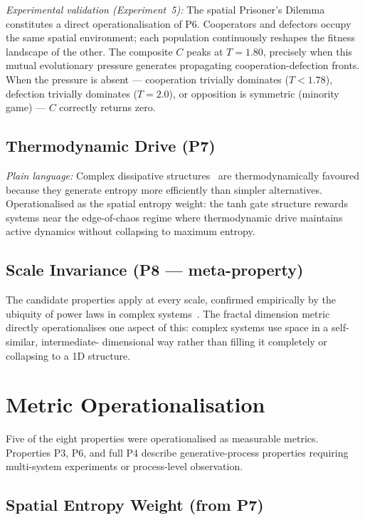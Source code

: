 \documentclass[12pt,a4paper]{article}
\begin{document}
\textit{Experimental validation (Experiment~5):}
The spatial Prisoner's Dilemma constitutes a direct operationalisation
of P6.
Cooperators and defectors occupy the same spatial environment; each
population continuously reshapes the fitness landscape of the other.
The composite $C$ peaks at $T\!=\!1.80$, precisely when this mutual
evolutionary pressure generates propagating cooperation-defection fronts.
When the pressure is absent --- cooperation trivially dominates
($T\!<\!1.78$), defection trivially dominates ($T\!=\!2.0$), or
opposition is symmetric (minority game) --- $C$ correctly returns zero.

\subsection{Thermodynamic Drive (P7)}

\textit{Plain language:} Complex dissipative structures~\cite{prigogine1977}
are thermodynamically favoured because they generate entropy more
efficiently than simpler alternatives.
Operationalised as the spatial entropy weight: the tanh gate structure
rewards systems near the edge-of-chaos regime where thermodynamic
drive maintains active dynamics without collapsing to maximum entropy.

\subsection{Scale Invariance (P8 --- meta-property)}

The candidate properties apply at every scale, confirmed empirically
by the ubiquity of power laws in complex systems~\cite{bak1987}.
The fractal dimension metric directly operationalises one aspect of
this: complex systems use space in a self-similar, intermediate-
dimensional way rather than filling it completely or collapsing to
a 1D structure.

\section{Metric Operationalisation}

Five of the eight properties were operationalised as measurable metrics.
Properties P3, P6, and full P4 describe generative-process properties
requiring multi-system experiments or process-level observation.

\subsection{Spatial Entropy Weight (from P7)}
\end{document}
